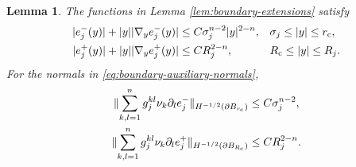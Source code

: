 \documentclass[11pt]{article}
\numberwithin{equation}{section}
\newtheorem{lemma}[theorem]{Lemma}
\theoremstyle{remark}
\newcommand{\norm}[1]{\lVert #1\rVert}
\begin{document}
\begin{lemma}\label{lem:boundary-extension-decay}
The functions in Lemma  \ref{lem:boundary-extensions} satisfy
\begin{equation}\label{eq:boundary-extension-pointwise}
 \begin{aligned}
 |e_j^-(y)|+|y||\nabla_ye_j^-(y)|
 &\le C\sigma_j^{n-2}|y|^{2-n},
 &&\sigma_j\le|y|\le r_{\rm c},\\
 |e_j^+(y)|+|y||\nabla_ye_j^+(y)|
 &\le CR_j^{2-n},
 &&R_{\rm c}\le|y|\le R_j.
 \end{aligned}
\end{equation}
For the normals in \eqref{eq:boundary-auxiliary-normals},
\begin{equation}\label{eq:boundary-extension-conormal}
 \begin{aligned}
 \norm{\sum_{k,l=1}^ng_j^{kl}\nu_k\partial_le_j^-}_{H^{-1/2}(\partial B_{r_{\rm c}})}
 &\le C\sigma_j^{n-2},\\
 \norm{\sum_{k,l=1}^ng_j^{kl}\nu_k\partial_le_j^+}_{H^{-1/2}(\partial B_{R_{\rm c}})}
 &\le CR_j^{2-n}.
 \end{aligned}
\end{equation}
\end{lemma}
\end{document}
